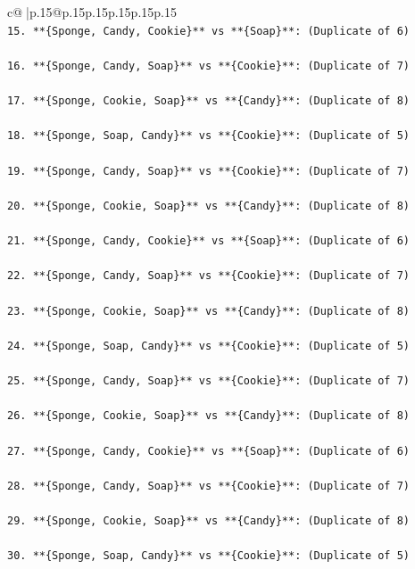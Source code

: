 \documentclass{article}
\begin{document}
{\begin{supertabular}{c@{$\;$}|p{.15\linewidth}@{}p{.15\linewidth}p{.15\linewidth}p{.15\linewidth}p{.15\linewidth}p{.15\linewidth}}
{{{\\ 
\texttt{15. **\{Sponge, Candy, Cookie\}** vs **\{Soap\}**: (Duplicate of 6)} \\
\\ 
\texttt{16. **\{Sponge, Candy, Soap\}** vs **\{Cookie\}**: (Duplicate of 7)} \\
\\ 
\texttt{17. **\{Sponge, Cookie, Soap\}** vs **\{Candy\}**: (Duplicate of 8)} \\
\\ 
\texttt{18. **\{Sponge, Soap, Candy\}** vs **\{Cookie\}**: (Duplicate of 5)} \\
\\ 
\texttt{19. **\{Sponge, Candy, Soap\}** vs **\{Cookie\}**: (Duplicate of 7)} \\
\\ 
\texttt{20. **\{Sponge, Cookie, Soap\}** vs **\{Candy\}**: (Duplicate of 8)} \\
\\ 
\texttt{21. **\{Sponge, Candy, Cookie\}** vs **\{Soap\}**: (Duplicate of 6)} \\
\\ 
\texttt{22. **\{Sponge, Candy, Soap\}** vs **\{Cookie\}**: (Duplicate of 7)} \\
\\ 
\texttt{23. **\{Sponge, Cookie, Soap\}** vs **\{Candy\}**: (Duplicate of 8)} \\
\\ 
\texttt{24. **\{Sponge, Soap, Candy\}** vs **\{Cookie\}**: (Duplicate of 5)} \\
\\ 
\texttt{25. **\{Sponge, Candy, Soap\}** vs **\{Cookie\}**: (Duplicate of 7)} \\
\\ 
\texttt{26. **\{Sponge, Cookie, Soap\}** vs **\{Candy\}**: (Duplicate of 8)} \\
\\ 
\texttt{27. **\{Sponge, Candy, Cookie\}** vs **\{Soap\}**: (Duplicate of 6)} \\
\\ 
\texttt{28. **\{Sponge, Candy, Soap\}** vs **\{Cookie\}**: (Duplicate of 7)} \\
\\ 
\texttt{29. **\{Sponge, Cookie, Soap\}** vs **\{Candy\}**: (Duplicate of 8)} \\
\\ 
\texttt{30. **\{Sponge, Soap, Candy\}** vs **\{Cookie\}**: (Duplicate of 5)} \\
}}}
\end{supertabular}}
\end{document}
